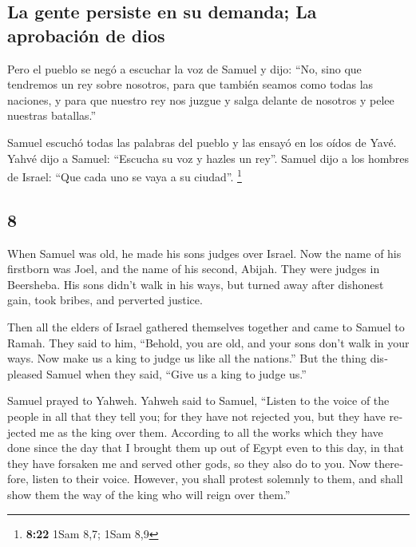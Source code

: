 \begin{paracol}{2}
\hypertarget{la-gente-persiste-en-su-demanda-la-aprobaciuxf3n-de-dios}{%
\subsection{La gente persiste en su demanda; La aprobación de
dios}\label{la-gente-persiste-en-su-demanda-la-aprobaciuxf3n-de-dios}}

 Pero el pueblo se negó a escuchar la voz de Samuel y
dijo: ``No, sino que tendremos un rey sobre nosotros, 
para que también seamos como todas las naciones, y para que nuestro rey
nos juzgue y salga delante de nosotros y pelee nuestras batallas.''

 Samuel escuchó todas las palabras del pueblo y las
ensayó en los oídos de Yavé.  Yahvé dijo a Samuel:
``Escucha su voz y hazles un rey''. Samuel dijo a los hombres de Israel:
``Que cada uno se vaya a su ciudad''. \footnote{\textbf{8:22} 1Sam 8,7;
  1Sam 8,9}

\switchcolumn
\begin{otherlanguage}{english}

\hypertarget{section-15}{%
\section{8}\label{section-15}}

 When Samuel was old, he made his sons judges over Israel.
 Now the name of his firstborn was Joel, and the name of
his second, Abijah. They were judges in Beersheba.  His
sons didn't walk in his ways, but turned away after dishonest gain, took
bribes, and perverted justice.

 Then all the elders of Israel gathered themselves
together and came to Samuel to Ramah.  They said to him,
``Behold, you are old, and your sons don't walk in your ways. Now make
us a king to judge us like all the nations.''  But the
thing displeased Samuel when they said, ``Give us a king to judge us.''

Samuel prayed to Yahweh.  Yahweh said to Samuel, ``Listen
to the voice of the people in all that they tell you; for they have not
rejected you, but they have rejected me as the king over them.
 According to all the works which they have done since the
day that I brought them up out of Egypt even to this day, in that they
have forsaken me and served other gods, so they also do to you.
 Now therefore, listen to their voice. However, you shall
protest solemnly to them, and shall show them the way of the king who
will reign over them.''


\end{otherlanguage}
\end{paracol}
